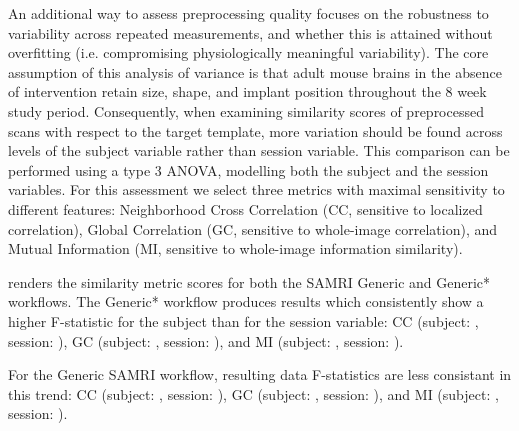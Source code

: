 An additional way to assess preprocessing quality focuses on the robustness to variability across repeated measurements, and whether this is attained without overfitting (i.e. compromising physiologically meaningful variability).
The core assumption of this analysis of variance is that adult mouse brains in the absence of intervention retain size, shape, and implant position throughout the 8 week study period.
Consequently, when examining similarity scores of preprocessed scans with respect to the target template, more variation should be found across levels of the subject variable rather than session variable.
This comparison can be performed using a type 3 ANOVA, modelling both the subject and the session variables.
For this assessment we select three metrics with maximal sensitivity to different features:
Neighborhood Cross Correlation (CC, sensitive to localized correlation),
Global Correlation (GC, sensitive to whole-image correlation),
and Mutual Information (MI, sensitive to whole-image information similarity).

 renders the similarity metric scores for both the SAMRI Generic and Generic* workflows.
The Generic* workflow produces results which consistently show a higher F-statistic for the subject than for the session variable:
CC (subject: , session: ),
GC (subject: , session: ),
and MI (subject: , session: ).

For the Generic SAMRI workflow, resulting data F-statistics are less consistant in this trend:
CC (subject: , session: ),
GC (subject: , session: ),
and MI (subject: , session: ).
